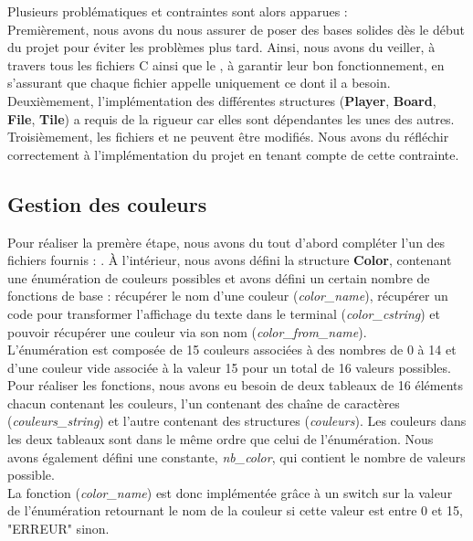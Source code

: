 \documentclass[a4paper]{article}
\begin{document}
Plusieurs problématiques et contraintes sont alors apparues : \\
Premièrement, nous avons du nous assurer de poser des bases solides dès le début du projet pour éviter les problèmes plus tard. Ainsi, nous avons du veiller, à travers tous les fichiers C ainsi que le , à garantir leur bon fonctionnement, en s'assurant que chaque fichier appelle uniquement ce dont il a besoin. \\
Deuxièmement, l'implémentation des différentes structures (\textbf{Player}, \textbf{Board}, \textbf{File}, \textbf{Tile}) a requis de la rigueur car elles sont dépendantes les unes des autres.\\
Troisièmement, les fichiers  et  ne peuvent être modifiés. Nous avons du réfléchir correctement à l'implémentation du projet en tenant compte de cette contrainte. 

\subsection{Gestion des couleurs}
Pour réaliser la premère étape, nous avons du tout d'abord compléter l'un des fichiers fournis : .
À l'intérieur, nous avons défini la structure \textbf{Color}, contenant une énumération de couleurs possibles et avons défini un certain nombre de fonctions de base : récupérer le nom d'une couleur (\emph{color\_name}), récupérer un code pour transformer l'affichage du texte dans le terminal (\emph{color\_cstring}) et pouvoir récupérer une couleur via son nom (\emph{color\_from\_name}). \\

L'énumération est composée de 15 couleurs associées à des nombres de 0 à 14 et d'une couleur vide associée à la valeur 15 pour un total de 16 valeurs possibles.
Pour réaliser les fonctions, nous avons eu besoin de deux tableaux de 16 éléments chacun contenant les couleurs, l'un contenant des chaîne de caractères (\emph{couleurs\_string}) et l'autre contenant des structures (\emph{couleurs}). Les couleurs dans les deux tableaux sont dans le même ordre que celui de l'énumération. Nous avons également défini une constante, \emph{nb\_color}, qui contient le nombre de valeurs possible. \\

La fonction (\emph{color\_name}) est donc implémentée grâce à un switch sur la valeur de l'énumération retournant le nom de la couleur si cette valeur est entre 0 et 15, "ERREUR" sinon. 
\end{document}
